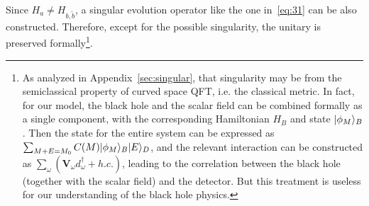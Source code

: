 \documentclass[12pt,a4paper]{article}
\begin{document}
Since $H_{a}\neq H_{b,\tilde{b}}$, a singular evolution operator like the one in~\eqref{eq:31} can be also constructed. Therefore,
except for the possible singularity, the unitary is preserved formally\footnote{As analyzed in Appendix~\ref{sec:singular}, that singularity may be from the semiclassical property of curved space QFT, i.e. the classical metric. In fact, for our model, the black hole and the scalar field can be combined formally as
a single component, with the corresponding Hamiltonian $H_{B}$ and state $\arrowvert\phi_M\rangle_B$.
Then the state for the entire system can be expressed as
$\sum_{M+E=M_0}C(M)\arrowvert\phi_M\rangle_{B}\arrowvert
E\rangle_D$, and the relevant interaction can be constructed as
$\sum_{\omega}(\mathbf{V}_{\omega}d_{\omega}^{\dag}+h.c.)$,
leading to the correlation between the black hole (together with the scalar
field) and the detector. But this treatment is useless for our understanding of the black hole physics.}.
\end{document}
